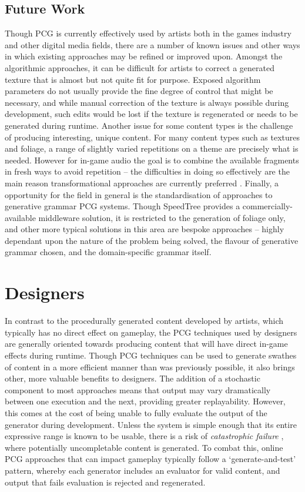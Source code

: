 \documentclass{acm_proc_article-sp}
\begin{document}
\subsection{Future Work}
Though PCG is currently effectively used by artists both in the games industry and other digital media fields, there are a number of known issues and other ways in which existing approaches may be refined or improved upon. Amongst the algorithmic approaches, it can be difficult for artists to correct a generated texture that is almost but not quite fit for purpose. Exposed algorithm parameters do not usually provide the fine degree of control that might be necessary, and while manual correction of the texture is always possible during development, such edits would be lost if the texture is regenerated or needs to be generated during runtime.
Another issue for some content types is the challenge of producing interesting, unique content. For many content types such as textures and foliage, a range of slightly varied repetitions on a theme are precisely what is needed. However for in-game audio the goal is to combine the available fragments in fresh ways to avoid repetition -- the difficulties in doing so effectively are the main reason transformational approaches are currently preferred \cite{collins2009introduction}.
Finally, a opportunity for the field in general is the standardisation of approaches to generative grammar PCG systems. Though SpeedTree provides a commercially-available middleware solution, it is restricted to the generation of foliage only, and other more typical solutions in this area are bespoke approaches -- highly dependant upon the nature of the problem being solved, the flavour of generative grammar chosen, and the domain-specific grammar itself.



\section{Designers}
In contrast to the procedurally generated content developed by artists, which typically has no direct effect on gameplay, the PCG techniques used by designers are generally oriented towards producing content that will have direct in-game effects during runtime. Though PCG techniques can be used to generate swathes of content in a more efficient manner than was previously possible, it also brings other, more valuable benefits to designers. The addition of a stochastic component to most approaches means that output may vary dramatically between one execution and the next, providing greater replayability. However, this comes at the cost of being unable to fully evaluate the output of the generator during development. Unless the system is simple enough that its entire expressive range is known to be usable, there is a risk of \textit{catastrophic failure} \cite{togelius2011search}, where potentially uncompletable content is generated. To combat this, online PCG approaches that can impact gameplay typically follow a `generate-and-test' pattern, whereby each generator includes an evaluator for valid content, and output that fails evaluation is rejected and regenerated.
\end{document}
